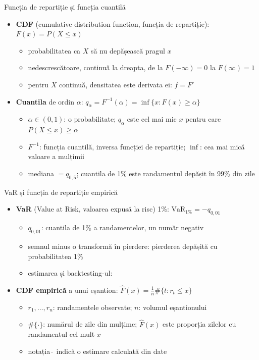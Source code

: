 \begin{frame}{Funcția de repartiție și funcția cuantilă}
\itemsize{\small}
\begin{itemize}
    \item \textbf{CDF} (cumulative distribution function, funcția de repartiție): $F(x) = P(X \le x)$
    \begin{itemize}
        \item probabilitatea ca $X$ să nu depășească pragul $x$
        \item nedescrescătoare, continuă la dreapta, de la $F(-\infty) = 0$ la $F(\infty) = 1$
        \item pentru $X$ continuă, densitatea este derivata ei: $f = F'$
    \end{itemize}
    \item \textbf{Cuantila} de ordin $\alpha$: $q_\alpha = F^{-1}(\alpha) = \inf\{x : F(x) \ge \alpha\}$
    \begin{itemize}
        \item $\alpha \in (0, 1)$: o probabilitate; $q_\alpha$ este cel mai mic $x$ pentru care $P(X \le x) \ge \alpha$
        \item $F^{-1}$: funcția cuantilă, inversa funcției de repartiție; $\inf$: cea mai mică valoare a mulțimii
        \item mediana $= q_{0{,}5}$; cuantila de 1\% este randamentul depășit în 99\% din zile
    \end{itemize}
\end{itemize}
\end{frame}

\begin{frame}{VaR și funcția de repartiție empirică}
\itemsize{\small}
\begin{itemize}
    \item \textbf{VaR} (Value at Risk, valoarea expusă la risc) 1\%: $\text{VaR}_{1\%} = -q_{0{,}01}$
    \begin{itemize}
        \item $q_{0{,}01}$: cuantila de 1\% a randamentelor, un număr negativ
        \item semnul minus o transformă în pierdere: pierderea depășită cu probabilitatea 1\%
        \item estimarea și backtesting-ul: 
    \end{itemize}
    \item \textbf{CDF empirică} a unui eșantion: $\hat F(x) = \frac1n \#\{t : r_t \le x\}$
    \begin{itemize}
        \item $r_1, \dots, r_n$: randamentele observate; $n$: volumul eșantionului
        \item $\#\{\cdot\}$: numărul de zile din mulțime; $\hat F(x)$ este proporția zilelor cu randamentul cel mult $x$
        \item notația $\hat{\ }$ indică o estimare calculată din date
    \end{itemize}
\end{itemize}
\end{frame}


